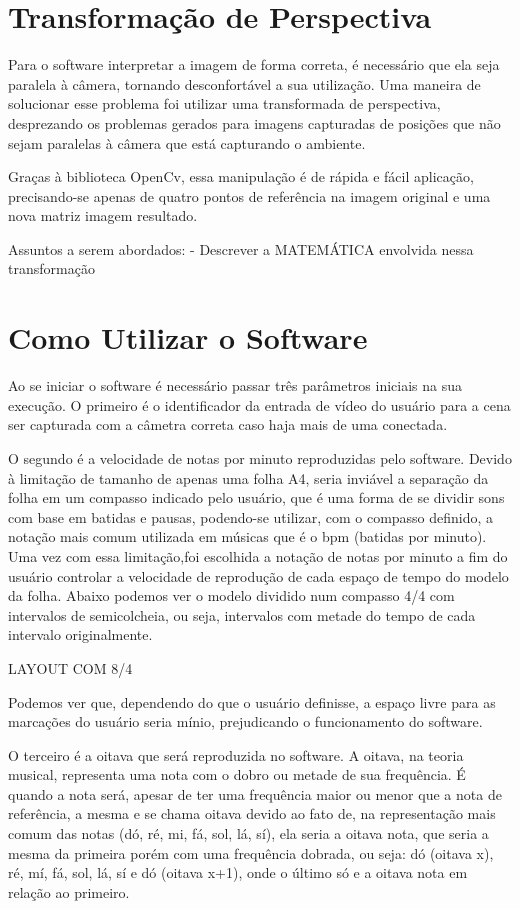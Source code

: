 \documentclass[12pt]{report}
\begin{document}
\chapter{Transformação de Perspectiva}
\label{cha:fund-teor}

Para o software interpretar a imagem de forma correta, é necessário que ela seja paralela à câmera, tornando desconfortável a sua utilização. Uma maneira de solucionar esse problema foi utilizar uma transformada de perspectiva, desprezando os problemas gerados para imagens capturadas de posições que não sejam paralelas à câmera que está capturando o ambiente.

Graças à biblioteca OpenCv, essa manipulação é de rápida e fácil aplicação, precisando-se apenas de quatro pontos de referência na imagem original e uma nova matriz imagem resultado.



Assuntos a serem abordados:
- Descrever a MATEMÁTICA envolvida nessa transformação 

\chapter{Como Utilizar o Software}
\label{cha:fund-teor}

Ao se iniciar o software é necessário passar três parâmetros iniciais na sua execução. O primeiro é o identificador da entrada de vídeo do usuário para a cena ser capturada com a câmetra correta caso haja mais de uma conectada.

O segundo é a velocidade de notas por minuto reproduzidas pelo software. Devido à limitação de tamanho de apenas uma folha A4, seria inviável a separação da folha em um compasso indicado pelo usuário, que é uma forma de se dividir sons com base em batidas e pausas, podendo-se utilizar, com o compasso definido, a notação mais comum utilizada em músicas que é o bpm (batidas por minuto). Uma vez com essa limitação,foi escolhida a notação de notas por minuto a fim do usuário controlar a velocidade de reprodução de cada espaço de tempo do modelo da folha. Abaixo podemos ver o modelo dividido num compasso 4/4 com intervalos de semicolcheia, ou seja, intervalos com metade do tempo de cada intervalo originalmente.

LAYOUT COM 8/4

Podemos ver que, dependendo do que o usuário definisse, a espaço livre para as marcações do usuário seria mínio, prejudicando o funcionamento do software.

O terceiro é a oitava que será reproduzida no software. A oitava, na teoria musical, representa uma nota com o dobro ou metade de sua frequência. É quando a nota será, apesar de ter uma frequência maior ou menor que a nota de referência, a mesma e se chama oitava devido ao fato de, na representação mais comum das notas (dó, ré, mi, fá, sol, lá, sí), ela seria a oitava nota, que seria a mesma da primeira porém com uma frequência dobrada, ou seja: dó (oitava x), ré, mí, fá, sol, lá, sí e dó (oitava x+1), onde o último só e a oitava nota em relação ao primeiro.
\end{document}
